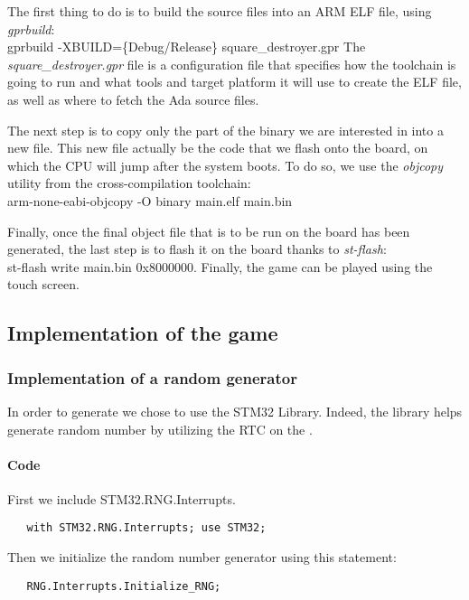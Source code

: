 The first thing to do is to build the source files into an ARM ELF file, using
\textit{gprbuild}:\\
gprbuild -XBUILD=\{Debug/Release\} square\_destroyer.gpr
The \textit{square\_destroyer.gpr} file is a configuration file that specifies
how the toolchain is going to run and what tools and target platform it will
use to create the ELF file, as well as where to fetch the Ada source files.

The next step is to copy only the part of the binary we are interested in into
a new file. This new file actually be the code that we flash onto the board,
on which the CPU will jump after the system boots. To do so, we use the
\textit{objcopy} utility from the cross-compilation toolchain:\\
arm-none-eabi-objcopy -O binary main.elf main.bin

Finally, once the final object file that is to be run on the board has been
generated, the last step is to flash it on the board thanks to \textit{st-flash}:\\
st-flash write main.bin 0x8000000. Finally, the game can be played using the
touch screen.
\newpage

\subsection{Implementation of the game}

\subsubsection{Implementation of a random \sq generator}

In order to generate \sqs we chose to use the STM32 Library.
Indeed, the library helps generate random number by utilizing the RTC on the \stmdb.

\paragraph{Code}

\noindent
First we include STM32.RNG.Interrupts.
\begin{lstlisting}
   with STM32.RNG.Interrupts; use STM32;
\end{lstlisting}


\noindent
Then we initialize the random number generator using this statement:
\begin{lstlisting}
   RNG.Interrupts.Initialize_RNG;
\end{lstlisting}


